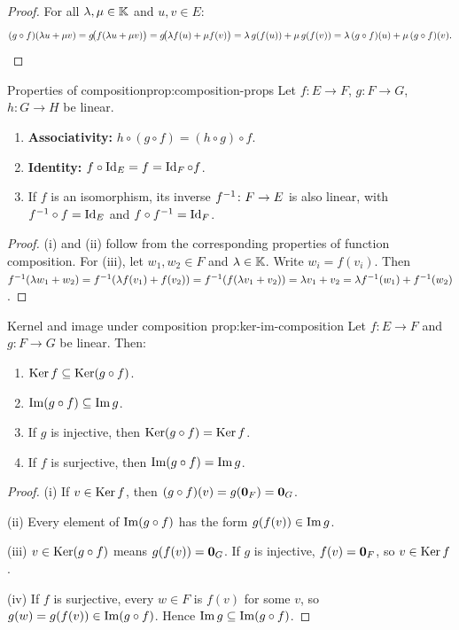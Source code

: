 \begin{proof}
For all $\lambda,\mu\in{\mathbb{K}}$ and $u,v\in E$:
\[
  (g\circ f)(\lambda u+\mu v)
  = g\!\bigl(f(\lambda u+\mu v)\bigr)
  = g\!\bigl(\lambda f(u)+\mu f(v)\bigr)
  = \lambda\, g(f(u))+\mu\, g(f(v))
  = \lambda\,(g\circ f)(u)+\mu\,(g\circ f)(v).\qedhere
\]
\end{proof}

\begin{proposition}{Properties of composition}{prop:composition-props}
Let $f\colon E\to F$, $g\colon F\to G$, $h\colon G\to H$ be linear.
\begin{enumerate}[label=(\roman*)]
  \item \textbf{Associativity:} $h\circ(g\circ f) = (h\circ g)\circ f$.
  \item \textbf{Identity:} $f\circ\operatorname{Id}_E = f = \operatorname{Id}_F\circ f$.
  \item If $f$ is an isomorphism, its inverse ${f}^{-1}\colon F\to E$
    is also linear, with ${f}^{-1}\circ f = \operatorname{Id}_E$ and
    $f\circ{f}^{-1} = \operatorname{Id}_F$.
\end{enumerate}
\end{proposition}

\begin{proof}
(i) and (ii) follow from the corresponding properties of function
composition. For (iii), let $w_1,w_2\in F$ and $\lambda\in{\mathbb{K}}$. Write
$w_i = f(v_i)$. Then ${f}^{-1}(\lambda w_1 + w_2) =
{f}^{-1}(\lambda f(v_1)+f(v_2)) = {f}^{-1}(f(\lambda v_1+v_2)) =
\lambda v_1+v_2 = \lambda{f}^{-1}(w_1)+{f}^{-1}(w_2)$.
\end{proof}

\begin{proposition}{Kernel and image under composition}%
{prop:ker-im-composition}
Let $f\colon E\to F$ and $g\colon F\to G$ be linear. Then:
\begin{enumerate}[label=(\roman*)]
  \item $\operatorname{Ker} f \subseteq \operatorname{Ker}(g\circ f)$.
  \item $\operatorname{Im}(g\circ f) \subseteq \operatorname{Im} g$.
  \item If $g$ is injective, then $\operatorname{Ker}(g\circ f) = \operatorname{Ker} f$.
  \item If $f$ is surjective, then $\operatorname{Im}(g\circ f) = \operatorname{Im} g$.
\end{enumerate}
\end{proposition}

\begin{proof}
(i) If $v\in\operatorname{Ker} f$, then $(g\circ f)(v) = g(\mathbf{0}_F) = \mathbf{0}_G$.

(ii) Every element of $\operatorname{Im}(g\circ f)$ has the form $g(f(v))\in\operatorname{Im} g$.

(iii) $v\in\operatorname{Ker}(g\circ f)$ means $g(f(v))=\mathbf{0}_G$. If $g$ is
injective, $f(v) = \mathbf{0}_F$, so $v\in\operatorname{Ker} f$.

(iv) If $f$ is surjective, every $w\in F$ is $f(v)$ for some $v$,
so $g(w) = g(f(v)) \in \operatorname{Im}(g\circ f)$. Hence $\operatorname{Im} g\subseteq\operatorname{Im}(g\circ f)$.
\end{proof}


